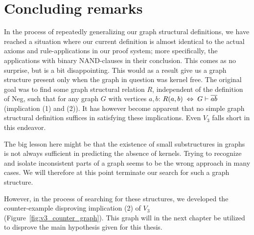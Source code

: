 \section{Concluding remarks}
\label{sec:Concluding remarks}
In the process of repeatedly generalizing our graph structural definitions, we have reached a situation where our current definition is almost identical to the actual axioms and rule-applications in our proof system; more specifically, the applications with binary NAND-clauses in their conclusion.
This comes as no surprise, but is a bit disappointing.
This would as a result give us a graph structure present only when the graph in question was kernel free.
The original goal was to find some graph structural relation $R$, independent of the definition of Neg, such that for any graph $G$ with vertices $a,b$: $R(a,b) \; \Leftrightarrow \; G\vdash \ol{ab}$ (implication (1) and (2)).
It has however become apparent that no simple graph structural definition suffices in satisfying these implications.
Even $V_3$ falls short in this endeavor.

The big lesson here might be that the existence of small substructures in graphs is not always sufficient in predicting the absence of kernels.
Trying to recognize and isolate inconsistent parts of a graph seems to be the wrong approach in many cases.
We will therefore at this point terminate our search for such a graph structure.

However, in the process of searching for these structures, we developed the counter-example disproving implication (2) of $V_3$ (Figure~\ref{fig:v3_counter_graph}).
This graph will in the next chapter be utilized to disprove the main hypothesis given for this thesis.
